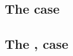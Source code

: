 \subsection{The  case}                            \label{bls: pointevaluation}    
\subsection{The ,  case}            \label{bls: g1add}               

